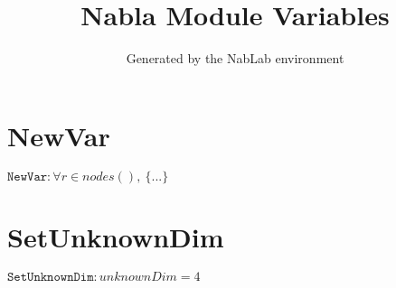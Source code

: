 \documentclass[11pt]{article}
\title{Nabla Module Variables}
\author{Generated by the NabLab environment}
\begin{document}
\maketitle


\section{NewVar}
$\texttt{NewVar} : \forall{r\in nodes()}, \ \{ ... \}$


\section{SetUnknownDim}
$\texttt{SetUnknownDim} : unknownDim = 4$
\end{document}
